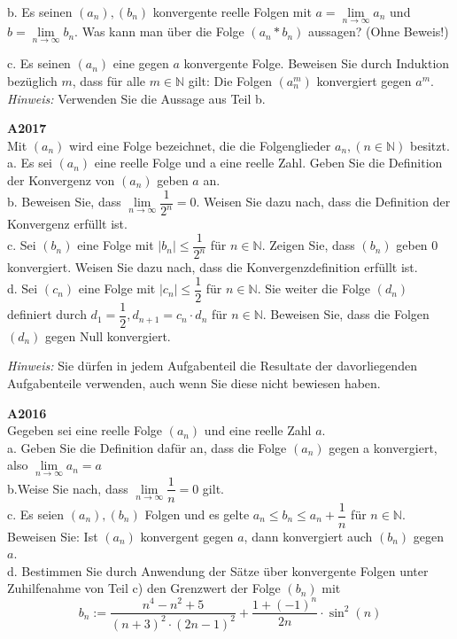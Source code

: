 \documentclass[landscape,twocolumn,a4paper]{article}
\begin{document}
b. Es seinen $(a_n),(b_n)$ konvergente reelle Folgen mit $a = \lim \limits_{n \to \infty} a_n$ und
$b = \lim \limits_{n \to \infty} b_n$. Was kann man über die Folge $(a_n * b_n)$ aussagen? (Ohne Beweis!) 

c. Es seinen $(a_n)$ eine gegen $a$ konvergente Folge. Beweisen Sie durch Induktion bezüglich $m$, dass für 
alle $m \in \mathbb{N}$ gilt: Die Folgen $(a_n^m)$ konvergiert gegen $a^m$. \textit{Hinweis:} Verwenden Sie die Aussage aus Teil b.
\bigskip 

\newpage

\textbf{A2017} \\
Mit $(a_n)$ wird eine Folge bezeichnet, die die Folgenglieder $a_n, (n \in \mathbb{N})$ besitzt. \\
a. Es sei $(a_n)$ eine reelle Folge und a eine reelle Zahl. Geben Sie die Definition der Konvergenz von $(a_n)$ geben $a$ an. \\
b. Beweisen Sie, dass  $ \lim \limits_{n \to \infty} \dfrac{1}{2^n} = 0$. Weisen Sie dazu nach, dass die Definition der Konvergenz erfüllt ist. \\
c. Sei $(b_n)$ eine Folge mit $\left|b_n\right| \le \dfrac{1}{2^n}$ für $n \in \mathbb{N}$. Zeigen Sie,
dass $(b_n)$ geben $0$ konvergiert. Weisen Sie dazu nach, dass die Konvergenzdefinition erfüllt ist. \\
d. Sei $(c_n)$ eine Folge mit  $\left|c_n\right| \le \dfrac{1}{2}$ für $n \in \mathbb{N}$. Sie weiter die 
Folge $(d_n)$ definiert durch $d_1 = \dfrac{1}{2}, d_{n+1} = c_n \cdot d_n$ für $n \in \mathbb{N}$.
Beweisen Sie, dass die Folgen $(d_n)$ gegen Null konvergiert. 

\textit{Hinweis:} Sie dürfen in jedem Aufgabenteil die Resultate der davorliegenden Aufgabenteile verwenden, auch wenn Sie diese nicht bewiesen haben.
\bigskip 

\textbf{A2016} \\
Gegeben sei eine reelle Folge $(a_n)$ und eine reelle Zahl $a$. \\
a. Geben Sie die Definition dafür an, dass die Folge $(a_n)$ gegen a konvergiert, also $\lim \limits_{n \to \infty} a_n = a$ \\
b.Weise Sie nach, dass  $ \lim \limits_{n \to \infty} \dfrac{1}{n} = 0$ gilt. \\
c. Es seien $(a_n), (b_n)$ Folgen und es gelte $a_n \le b_n \le a_n + \dfrac{1}{n}$ für $n \in \mathbb{N}$.
Beweisen Sie: Ist $(a_n)$ konvergent gegen $a$, dann konvergiert auch $(b_n)$ gegen $a$. \\
d. Bestimmen Sie durch Anwendung der Sätze über konvergente Folgen unter Zuhilfenahme von Teil c) den Grenzwert der Folge $(b_n)$ mit 
$$b_n := \dfrac{n^4-n^2+5}{(n+3)^2 \cdot (2n-1)^2} + \dfrac{1+(-1)^n}{2n} \cdot  \sin^2(n)$$
\bigskip
\end{document}
